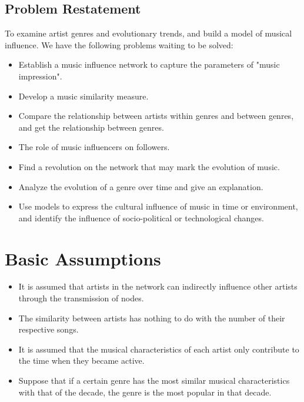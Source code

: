 \documentclass[12pt]{article}  %
\begin{document}
\subsection{Problem Restatement}
To examine artist genres and evolutionary trends, and build a model of musical influence. We have the following problems waiting to be solved:
\begin{itemize}
    \item Establish a music influence network to capture the parameters of "music impression". 
    \item Develop a music similarity measure. 
    \item Compare the relationship between artists within genres and between genres, and get the relationship between genres. 
    \item The role of music influencers on followers. 
    \item Find a revolution on the network that may mark the evolution of music. 
    \item Analyze the evolution of a genre over time and give an explanation. 
    \item Use models to express the cultural influence of music in time or environment, and identify the influence of socio-political or technological changes. 
\end{itemize}



\section{Basic Assumptions}
\begin{itemize}
    \item It is assumed that artists in the network can indirectly influence other artists through the transmission of nodes.
    \item The similarity between artists has nothing to do with the number of their respective songs.
    \item It is assumed that the musical characteristics of each artist only contribute to the time when they became active.
    \item Suppose that if a certain genre has the most similar musical characteristics with that of the decade, the genre is the most popular in that decade. 
\end{itemize}
\end{document}
